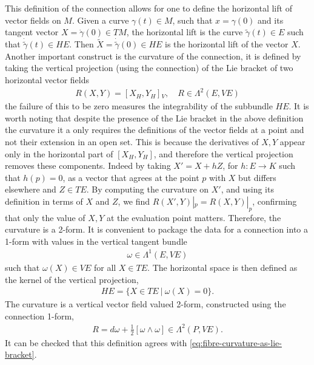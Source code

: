 \documentclass[10pt]{report}
\theoremstyle{definition}
\begin{document}
This definition of the connection allows for one to define the horizontal lift of vector fields on $M$. Given a curve $\gamma(t) \in M$, such that $x = \gamma(0)$ and its tangent vector $X = \dot{\gamma}(0) \in TM$, the horizontal lift is the curve $\tilde{\gamma}(t) \in E$ such that $\dot{\tilde{\gamma}}(t) \in HE$. Then $\tilde{X} = \dot{\tilde{\gamma}}(0) \in HE$ is the horizontal lift of the vector $X$. Another important construct is the curvature of the connection, it is defined by taking the vertical projection (using the connection) of the Lie bracket of two horizontal vector fields
\begin{align}
    R(X,Y) = \left[X_H,Y_H\right]{}_V, \quad R \in \Lambda^2(E,VE) \label{eq:fibre-curvature-as-lie-bracket}
\end{align}
the failure of this to be zero measures the integrability of the subbundle $HE$. It is worth noting that despite the presence of the Lie bracket in the above definition the curvature it a only requires the definitions of the vector fields at a point and not their extension in an open set. This is because the derivatives of $X,Y$ appear only in the horizontal part of $\left[X_H,Y_H\right]$, and therefore the vertical projection removes these components. Indeed by taking $X' = X + h Z$, for $h : E \rightarrow K$ such that $h(p) = 0$, as a vector that agrees at the point $p$ with $X$ but differs elsewhere and $Z \in TE$. By computing the curvature on $X'$, and using its definition in terms of $X$ and $Z$, we find $R(X',Y)|_p = R(X,Y)|_p$, confirming that only the value of $X,Y$ at the evaluation point matters. Therefore, the curvature is a 2-form. It is convenient to package the data for a connection into a 1-form with values in the vertical tangent bundle
\begin{align}
    \omega \in \Lambda^1(E,VE)
\end{align}
such that $\omega(X) \in VE$ for all $X \in TE$. The horizontal space is then defined as the kernel of the vertical projection,
\begin{align}
    HE = \{ X \in TE\ |\ \omega(X) = 0 \}.
\end{align}
The curvature is a vertical vector field valued 2-form, constructed using the connection 1-form, 
\begin{align}
    R = d\omega + \frac{1}{2} \left[ \omega \wedge \omega \right] \in \Lambda^2(P,VE).
\end{align}
It can be checked that this definition agrees with \cref{eq:fibre-curvature-as-lie-bracket}.
\end{document}
